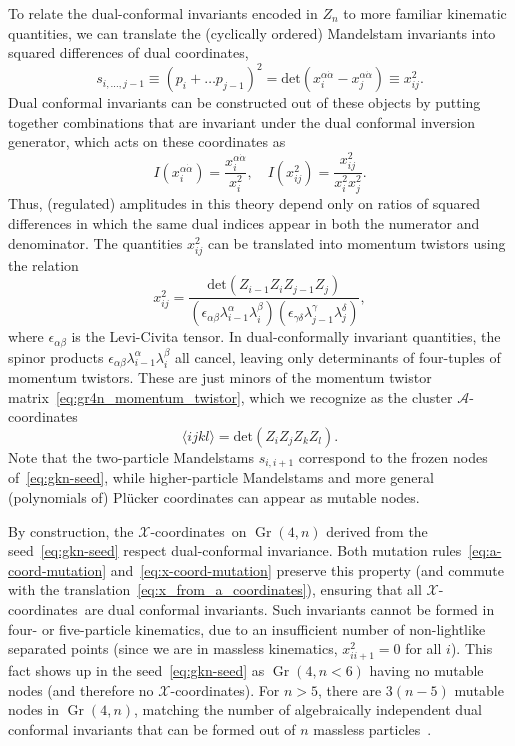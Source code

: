 \documentclass[11pt]{article}
\DeclareMathOperator{\Gr}{Gr}
\def\ket#1{\langle #1 \rangle}
\def\xcoords{$\mathcal{X}$-coordinates}
\def\acoords{$\mathcal{A}$-coordinates}
\begin{document}
To relate the dual-conformal invariants encoded in $Z_n$ to more familiar kinematic quantities, we can translate the (cyclically ordered) Mandelstam invariants into squared differences of dual coordinates,
\begin{equation} 
s_{i,\dots,j-1} \equiv (p_i + \dots p_{j-1})^2= \text{det}(x_i^{\alpha \dot \alpha} - x_j^{\alpha \dot \alpha}) \equiv x_{ij}^2. \label{eq:mandelstam_dual_coord}
\end{equation}
Dual conformal invariants can be constructed out of these objects by putting together combinations that are invariant under the dual conformal inversion generator, which acts on these coordinates as
\begin{equation}
I( x_i^{\alpha \dot \alpha}) = \frac{x_i^{\alpha \dot \alpha}}{x_i^2}, \quad  I(x_{ij}^2) = \frac{x_{ij}^2}{x_i^2 x_j^2}.
\end{equation}
Thus, (regulated) amplitudes in this theory depend only on ratios of squared differences in which the same dual indices appear in both the numerator and denominator. The quantities $x_{ij}^2$ can be translated into momentum twistors using the relation
\begin{equation}
x_{ij}^2 = \frac{\text{det}(Z_{i-1} Z_i Z_{j-1} Z_j)}{(\epsilon_{\alpha \beta} \lambda^\alpha_{i-1} \lambda^\beta_i) (\epsilon_{\gamma \delta} \lambda^\gamma_{j-1} \lambda^\delta_j)},
\end{equation}
where $\epsilon_{\alpha \beta}$ is the Levi-Civita tensor. In dual-conformally invariant quantities, the spinor products $\epsilon_{\alpha \beta} \lambda^\alpha_{i-1} \lambda^\beta_i$ all cancel, leaving only determinants of four-tuples of momentum twistors. These are just minors of the momentum twistor matrix~\eqref{eq:gr4n_momentum_twistor}, which we recognize as the cluster \acoords  
\begin{equation}
\ket{i j k l} = \text{det}(Z_i Z_j Z_k Z_l).
\end{equation}
Note that the two-particle Mandelstams $s_{i,i+1}$ correspond to the frozen nodes of~\eqref{eq:gkn-seed}, while higher-particle Mandelstams and more general (polynomials of) Pl\"ucker coordinates can appear as mutable nodes.

By construction, the \xcoords\ on $\Gr(4,n)$ derived from the seed~\eqref{eq:gkn-seed} respect dual-conformal invariance. Both mutation rules~\eqref{eq:a-coord-mutation} and~\eqref{eq:x-coord-mutation} preserve this property (and commute with the translation~\eqref{eq:x_from_a_coordinates}), ensuring that all \xcoords\ are dual conformal invariants. Such invariants cannot be formed in four- or five-particle kinematics, due to an insufficient number of non-lightlike separated points (since we are in massless kinematics, $x_{ii+1}^2 = 0$ for all $i$). This fact shows up in the seed~\eqref{eq:gkn-seed} as $\Gr(4,n<6)$ having no mutable nodes (and therefore no \xcoords). For $n>5$, there are $3(n-5)$ mutable nodes in $\Gr(4,n)$, matching the number of algebraically independent dual conformal invariants that can be formed out of $n$ massless particles~\cite{}. %
\end{document}
